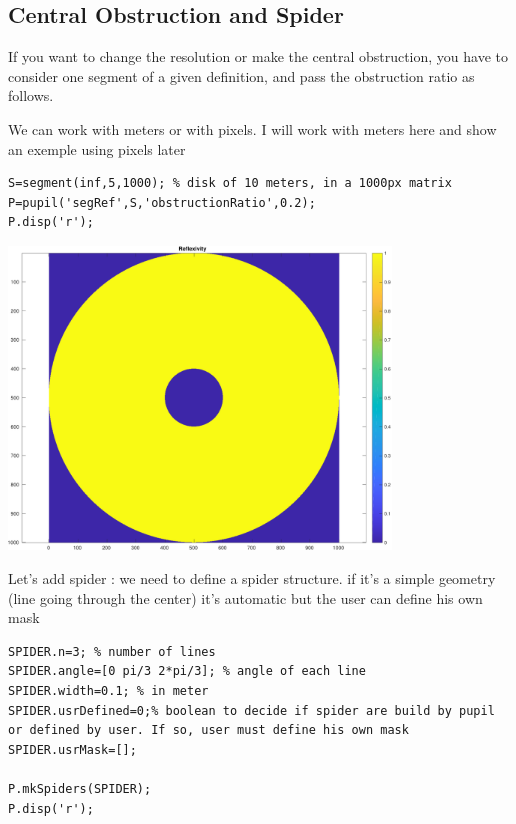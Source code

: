 \documentclass[12pt]{article}
\begin{document}
\subsection{Central Obstruction and Spider}

\begin{par}
If you want to change the resolution or make the central obstruction, you have to consider one segment of a given definition, and pass the obstruction ratio as follows.
\end{par} \vspace{1em}
\begin{par}
We can work with meters or with pixels. I will work with meters here and show an exemple using pixels later
\end{par} \vspace{1em}
\begin{verbatim}
S=segment(inf,5,1000); % disk of 10 meters, in a 1000px matrix
P=pupil('segRef',S,'obstructionRatio',0.2);
P.disp('r');
\end{verbatim}

\includegraphics [width=4in]{docuPupilClass_04.pdf}
\begin{par}
Let's add spider : we need to define a spider structure. if it's a simple geometry (line going through the center) it's automatic but the user can define his own mask
\end{par} \vspace{1em}
\begin{verbatim}
SPIDER.n=3; % number of lines
SPIDER.angle=[0 pi/3 2*pi/3]; % angle of each line
SPIDER.width=0.1; % in meter
SPIDER.usrDefined=0;% boolean to decide if spider are build by pupil or defined by user. If so, user must define his own mask
SPIDER.usrMask=[];

P.mkSpiders(SPIDER);
P.disp('r');
\end{verbatim}
\end{document}
